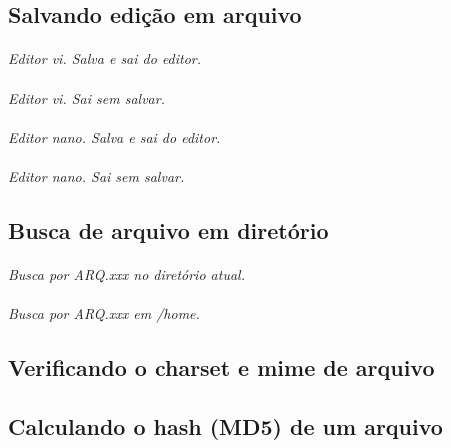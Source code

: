 \documentclass[a4paper,9pt]{extarticle}
\begin{document}
\begin{multicols}{2}
\subsection{Salvando edição em arquivo} 
	
	\paragraph{} \emph{Editor vi. Salva e sai do editor.}
	\paragraph{} \emph{Editor vi. Sai sem salvar.}
	\paragraph{} \emph{Editor nano. Salva e sai do editor.}
	\paragraph{} \emph{Editor nano. Sai sem salvar.}
	
\subsection{Busca de arquivo em diretório}
	
	\paragraph{} \emph{Busca por ARQ.xxx no diretório atual.}
	
	\paragraph{} \emph{Busca por ARQ.xxx em /home.}
	
\subsection{Verificando o charset e mime de arquivo}
	
		
\subsection{Calculando o hash (MD5) de um arquivo}


\end{multicols}
\end{document}
